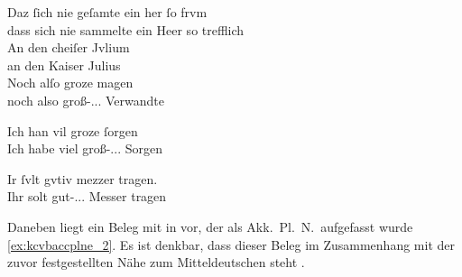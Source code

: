 \begin{exe}
\ex \label{ex:kcvbregel}
	\begin{xlist}
	\ex \label{ex:kcvbregel_1}
		\gll Daz ſich nie geſamte ein her ſo frvm \\
			dass sich nie sammelte ein Heer so trefflich \\
	\sn \gll An den cheiſer Jvlium \\
			an den Kaiser Julius \\
	\sn \gll Noch alſo groze magen \\
			noch also groß-\Nom.\Pl.\MascM.\St{} Verwandte \\
		\begin{taggedline}{\parencites[\pno~95\rb, 5--7]{kc:VB}[vgl.][14035--14036]{schroeder1895}}
		\trans {}
		\end{taggedline}

	\ex \label{ex:kcvbregel_2}
		\gll Ich han vil groze ſorgen \\
			Ich habe viel groß-\Acc.\Pl.\FemI.\St{} Sorgen \\
		\begin{taggedline}{\parencites[\pno~92\va, 22]{kc:VB}[zu][13514]{schroeder1895}}
		\trans {}
		\end{taggedline}

	\ex \label{ex:kcvbregel_3}
		\gll Ir ſvlt gvtiv mezzer tragen. \\
			Ihr solt gut-\Acc.\Pl.\NeutI.\St{} Messer tragen \\
		\begin{taggedline}{\parencites[\pno~24\va, 23]{kc:VB}[vgl.][4944]{schroeder1895}}
		\trans {}
		\end{taggedline}
	\end{xlist}
\end{exe}

Daneben liegt ein Beleg mit  in   vor, der als
Akk.\ Pl.\ N.\ aufgefasst wurde \cref{ex:kcvbaccplne_2}. Es ist denkbar, dass
dieser Beleg im Zusammenhang mit der zuvor festgestellten Nähe zum
Mitteldeutschen steht \autocites(siehe auch
\cref{phsec:vbherkunft})[vgl.][181--184]{ksw2}.

